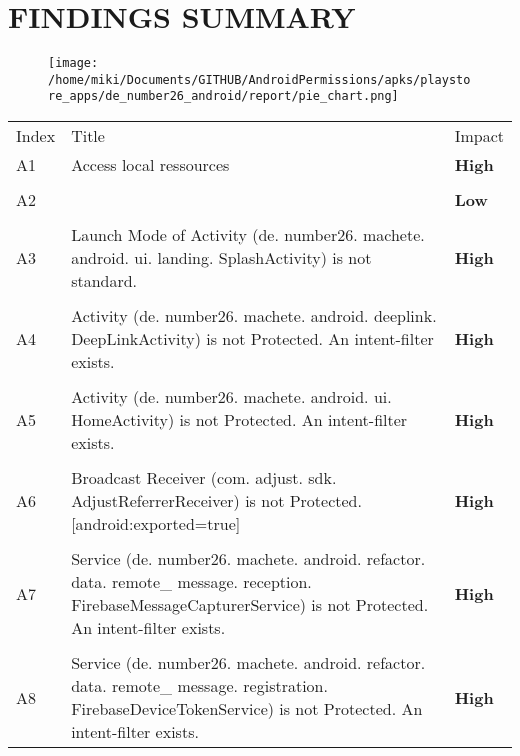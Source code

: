 \documentclass[12p]{article}
\begin{document}
\section{FINDINGS SUMMARY}\label{sec:summary}
\begin{figure}[H]
\centering
	\texttt{[image: /home/miki/Documents/GITHUB/AndroidPermissions/apks/playstore\_apps/de\_number26\_android/report/pie\_chart.png]}
\end{figure}
	\begin{longtable}{p{0.5cm} p{10cm} p{1.5cm}}
	\rowcolor{grannysmithapple!70} Index & Title & Impact \\
	A1&Access local ressources& \color{ferrarired}\textbf{High} \\
\hline\\	A2&& \color{amber}\textbf{Low} \\
\hline\\	A3&Launch Mode of Activity \newline (de. number26. machete. android. ui. landing. SplashActivity) is not standard.& \color{ferrarired}\textbf{High} \\
\hline\\	A4&Activity \newline (de. number26. machete. android. deeplink. DeepLinkActivity) is not Protected. An intent-filter exists.& \color{ferrarired}\textbf{High} \\
\hline\\	A5&Activity \newline (de. number26. machete. android. ui. HomeActivity) is not Protected. An intent-filter exists.& \color{ferrarired}\textbf{High} \\
\hline\\	A6&Broadcast Receiver \newline (com. adjust. sdk. AdjustReferrerReceiver) is not Protected. [android:exported=true]& \color{ferrarired}\textbf{High} \\
\hline\\	A7&Service \newline (de. number26. machete. android. refactor. data. remote\_ message. reception. FirebaseMessageCapturerService) is not Protected. An intent-filter exists.& \color{ferrarired}\textbf{High} \\
\hline\\	A8&Service \newline (de. number26. machete. android. refactor. data. remote\_ message. registration. FirebaseDeviceTokenService) is not Protected. An intent-filter exists.& \color{ferrarired}\textbf{High} \\

\end{longtable}
\end{document}
